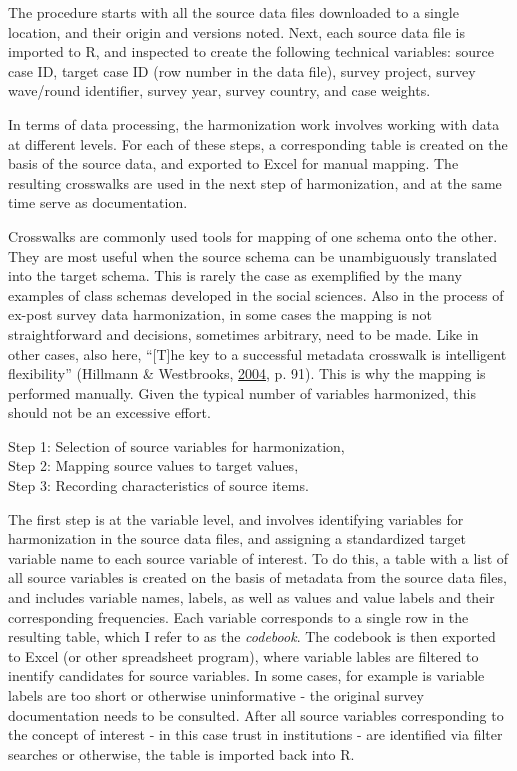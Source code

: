 \documentclass[12pt,]{article}
\begin{document}
The procedure starts with all the source data files downloaded to a single location, and their origin and versions noted. Next, each source data file is imported to R, and inspected to create the following technical variables: source case ID, target case ID (row number in the data file), survey project, survey wave/round identifier, survey year, survey country, and case weights.

In terms of data processing, the harmonization work involves working with data at different levels. For each of these steps, a corresponding table is created on the basis of the source data, and exported to Excel for manual mapping. The resulting crosswalks are used in the next step of harmonization, and at the same time serve as documentation.

Crosswalks are commonly used tools for mapping of one schema onto the other. They are most useful when the source schema can be unambiguously translated into the target schema. This is rarely the case as exemplified by the many examples of class schemas developed in the social sciences. Also in the process of ex-post survey data harmonization, in some cases the mapping is not straightforward and decisions, sometimes arbitrary, need to be made. Like in other cases, also here, ``{[}T{]}he key to a successful metadata crosswalk is intelligent flexibility'' (Hillmann \& Westbrooks, \protect\hyperlink{ref-Hillmann2004}{2004}, p. 91). This is why the mapping is performed manually. Given the typical number of variables harmonized, this should not be an excessive effort.

Step 1: Selection of source variables for harmonization,\\
Step 2: Mapping source values to target values,\\
Step 3: Recording characteristics of source items.

The first step is at the variable level, and involves identifying variables for harmonization in the source data files, and assigning a standardized target variable name to each source variable of interest. To do this, a table with a list of all source variables is created on the basis of metadata from the source data files, and includes variable names, labels, as well as values and value labels and their corresponding frequencies. Each variable corresponds to a single row in the resulting table, which I refer to as the \emph{codebook}. The codebook is then exported to Excel (or other spreadsheet program), where variable lables are filtered to inentify candidates for source variables. In some cases, for example is variable labels are too short or otherwise uninformative - the original survey documentation needs to be consulted. After all source variables corresponding to the concept of interest - in this case trust in institutions - are identified via filter searches or otherwise, the table is imported back into R.
\end{document}
